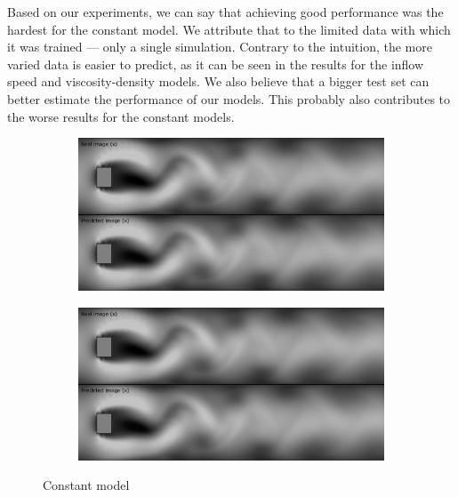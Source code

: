 \documentclass{llncs}
\begin{document}
Based on our experiments, we can say that achieving good performance was the hardest for the constant model. We attribute that to the limited data with which it was trained --- only a single simulation. Contrary to the intuition, the more varied data is easier to predict, as it can be seen in the results for the inflow speed and viscosity-density models. We also believe that a bigger test set can better estimate the performance of our models. This probably also contributes to the worse results for the constant models.

\begin{figure}

  \begin{subfigure}{.5\textwidth}
    \centering
    \includegraphics[width=1\linewidth]{imgs/single_constant_x}
  \end{subfigure}
  \begin{subfigure}{.5\textwidth}
    \centering
    \includegraphics[width=1\linewidth]{imgs/single_constant_y}

  \end{subfigure}
  \begin{center}
    Constant model
  \end{center}


\end{figure}
\end{document}
